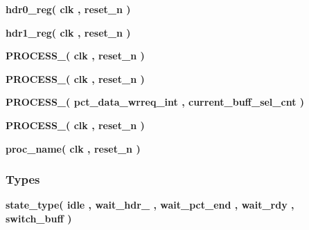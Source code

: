\begin{DoxyCompactItemize}
\item 
{\bf hdr0\+\_\+reg}{\bfseries  ( {\bfseries {\bfseries {\bf clk}} \textcolor{vhdlchar}{ }} , {\bfseries {\bfseries {\bf reset\+\_\+n}} \textcolor{vhdlchar}{ }} )}
\item 
{\bf hdr1\+\_\+reg}{\bfseries  ( {\bfseries {\bfseries {\bf clk}} \textcolor{vhdlchar}{ }} , {\bfseries {\bfseries {\bf reset\+\_\+n}} \textcolor{vhdlchar}{ }} )}
\item 
{\bf P\+R\+O\+C\+E\+S\+S\+\_}{\bfseries  ( {\bfseries {\bfseries {\bf clk}} \textcolor{vhdlchar}{ }} , {\bfseries {\bfseries {\bf reset\+\_\+n}} \textcolor{vhdlchar}{ }} )}
\item 
{\bf P\+R\+O\+C\+E\+S\+S\+\_}{\bfseries  ( {\bfseries {\bfseries {\bf clk}} \textcolor{vhdlchar}{ }} , {\bfseries {\bfseries {\bf reset\+\_\+n}} \textcolor{vhdlchar}{ }} )}
\item 
{\bf P\+R\+O\+C\+E\+S\+S\+\_}{\bfseries  ( {\bfseries {\bfseries {\bf pct\+\_\+data\+\_\+wrreq\+\_\+int}} \textcolor{vhdlchar}{ }} , {\bfseries {\bfseries {\bf current\+\_\+buff\+\_\+sel\+\_\+cnt}} \textcolor{vhdlchar}{ }} )}
\item 
{\bf P\+R\+O\+C\+E\+S\+S\+\_}{\bfseries  ( {\bfseries {\bfseries {\bf clk}} \textcolor{vhdlchar}{ }} , {\bfseries {\bfseries {\bf reset\+\_\+n}} \textcolor{vhdlchar}{ }} )}
\item 
{\bf proc\+\_\+name}{\bfseries  ( {\bfseries {\bfseries {\bf clk}} \textcolor{vhdlchar}{ }} , {\bfseries {\bfseries {\bf reset\+\_\+n}} \textcolor{vhdlchar}{ }} )}
\end{DoxyCompactItemize}
\subsubsection*{Types}
 \begin{DoxyCompactItemize}
\item 
{\bfseries {\bf state\+\_\+type}{\bfseries \textcolor{vhdlchar}{(}\textcolor{vhdlchar}{ }\textcolor{vhdlchar}{idle}\textcolor{vhdlchar}{ }\textcolor{vhdlchar}{,}\textcolor{vhdlchar}{ }\textcolor{vhdlchar}{wait\+\_\+hdr\+\_}\textcolor{vhdlchar}{ }\textcolor{vhdlchar}{,}\textcolor{vhdlchar}{ }\textcolor{vhdlchar}{wait\+\_\+pct\+\_\+end}\textcolor{vhdlchar}{ }\textcolor{vhdlchar}{,}\textcolor{vhdlchar}{ }\textcolor{vhdlchar}{wait\+\_\+rdy}\textcolor{vhdlchar}{ }\textcolor{vhdlchar}{,}\textcolor{vhdlchar}{ }\textcolor{vhdlchar}{switch\+\_\+buff}\textcolor{vhdlchar}{ }\textcolor{vhdlchar}{)}\textcolor{vhdlchar}{ }}} 
\end{DoxyCompactItemize}
